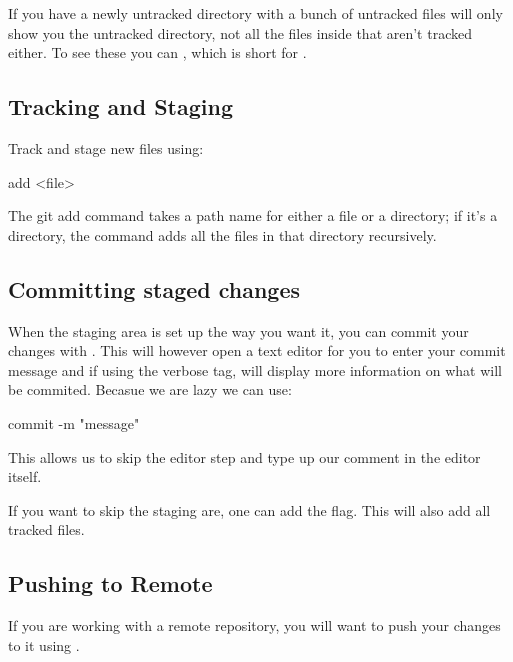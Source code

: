 If you have a newly untracked directory with a bunch of untracked files  will only show you the untracked directory, not all the files inside that aren't tracked either. To see these you can , which is short for .
\subsection{Tracking and Staging}
\noindent Track and stage new files using:
\begin{gitBashBox}
add <file>
\end{gitBashBox}
\noindent The git add command takes a path name for either a file or a directory; if it’s a directory, the command adds all the files in that directory recursively.

\subsection{Committing staged changes}
When the staging area is set up the way you want it, you can commit your changes with . This will however open a text editor for you to enter your commit message and if using the  verbose tag, will display more information on what will be commited.\newline
Becasue we are lazy we can use:
\begin{gitBashBox}
commit -m "message"
\end{gitBashBox}
This allows us to skip the editor step and type up our comment in the editor itself.\newline

If you want to skip the staging are, one can add the  flag. This will  also add all tracked files.

\subsection{Pushing to Remote}
If you are working with a remote repository, you will want to push your changes to it using .

